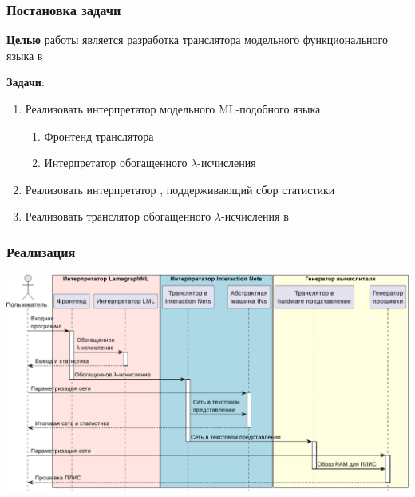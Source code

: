 \documentclass
  [ russian
  , aspectratio=169 %
  ] {beamer}
\begin{document}
\begin{frame}
    \frametitle{Постановка задачи}

    \textbf{Целью} работы является разработка транслятора модельного функционального языка в \INs{}
    \vspace{1em}

    \textbf{Задачи}:
    \begin{enumerate}
        \item Реализовать интерпретатор модельного ML-подобного языка
              \begin{enumerate}
                  \item Фронтенд транслятора
                  \item Интерпретатор обогащенного $\lambda$-исчисления
              \end{enumerate}
        \item Реализовать интерпретатор \INs{}, поддерживающий сбор статистики
        \item Реализовать транслятор обогащенного $\lambda$-исчисления в \INs{}
    \end{enumerate}

\end{frame}

\begin{frame}
    \frametitle{Реализация}

    \begin{center}
        \includegraphics[width=0.8\linewidth]{figures/using.pdf}
    \end{center}


\end{frame}
\end{document}
